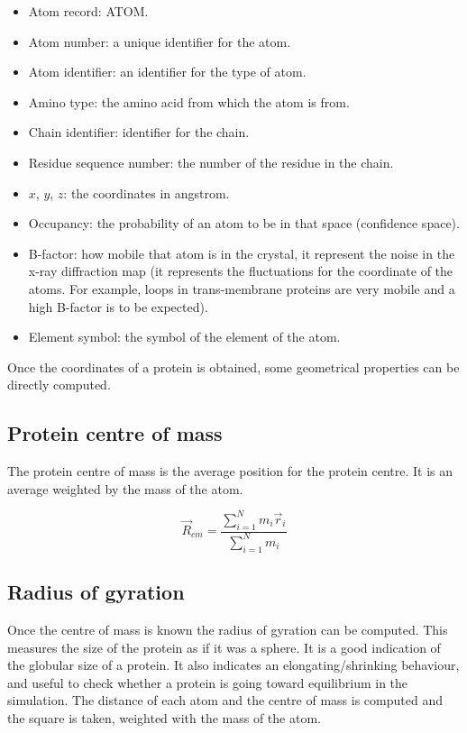 \begin{multicols}{2}
	\begin{itemize}
		\item Atom record: ATOM.
		\item Atom number: a unique identifier for the atom.
		\item Atom identifier: an identifier for the type of atom.
		\item Amino type: the amino acid from which the atom is from.
		\item Chain identifier: identifier for the chain.
		\item Residue sequence number: the number of the residue in the chain.
		\item $x$, $y$, $z$: the coordinates in angstrom.
		\item Occupancy: the probability of an atom to be in that space (confidence space).
		\item B-factor: how mobile that atom is in the crystal, it represent the noise in the x-ray diffraction map (it represents the fluctuations for the coordinate of the atoms. For example, loops in trans-membrane proteins are very mobile and a high B-factor is to be expected).
		\item Element symbol: the symbol of the element of the atom.
	\end{itemize}
\end{multicols}

Once the coordinates of a protein is obtained, some geometrical properties can be directly computed.

	\subsection{Protein centre of mass}
	The protein centre of mass is the average position for the protein centre.
	It is an average weighted by the mass of the atom.

	$$\vec{R}_{cm} = \frac{\sum\limits_{i=1}^Nm_i\vec{r}_i}{\sum\limits_{i=1}^Nm_i}$$

	\subsection{Radius of gyration}
	Once the centre of mass is known the radius of gyration can be computed.
	This measures the size of the protein as if it was a sphere.
	It is a good indication of the globular size of a protein.
	It also indicates an elongating/shrinking behaviour, and useful to check whether a protein is going toward equilibrium in the simulation.
	The distance of each atom and the centre of mass is computed and the square is taken, weighted with the mass of the atom.

